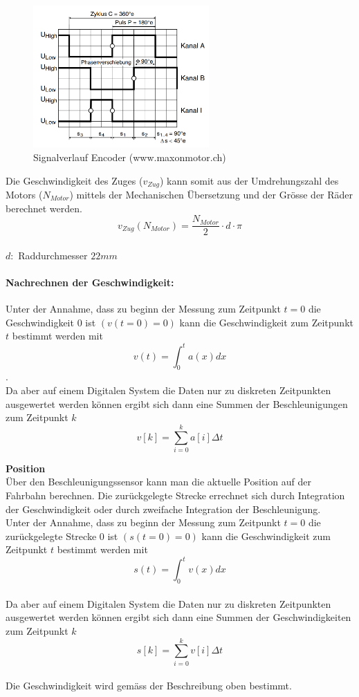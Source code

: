 \documentclass[../../main.tex]{subfiles}
\begin{document}
    \begin{figure}[H]
        \centering
        \includegraphics[width=0.6\textwidth]{Encoder_MR.png}
        \caption {Signalverlauf Encoder (www.maxonmotor.ch)}
        \label{fig:et_encoder}
    \end{figure}

    Die Geschwindigkeit des Zuges ($v_{Zug}$) kann somit aus der Umdrehungszahl des Motors ($N_{Motor}$) mittels der Mechanischen Übersetzung und der Grösse der Räder berechnet werden.
    $$v_{Zug}(N_{Motor}) = \frac{N_{Motor}}{2} \cdot d \cdot \pi$$\\
    $d:$ Raddurchmesser $22mm$\\

    \paragraph{Nachrechnen der Geschwindigkeit:}
    Unter der Annahme, dass zu beginn der Messung zum Zeitpunkt $t = 0$ die Geschwindigkeit $0$ ist $(v(t=0) = 0)$ kann die Geschwindigkeit zum Zeitpunkt $t$ bestimmt werden mit $$v(t) = \int_{0}^{t} a(x) dx$$.\\
    Da aber auf einem Digitalen System die Daten nur zu diskreten Zeitpunkten ausgewertet werden können ergibt sich dann eine Summen der Beschleunigungen zum Zeitpunkt $k$ $$v[k] = \sum_{i=0}^{k}a[i] \Delta t$$

    \textbf{Position}\\
    Über den Beschleunigungssensor kann man die aktuelle Position auf der Fahrbahn berechnen. Die zurückgelegte Strecke errechnet sich durch Integration der Geschwindigkeit oder durch zweifache Integration der Beschleunigung.\\
    Unter der Annahme, dass zu beginn der Messung zum Zeitpunkt $t = 0$ die zurückgelegte Strecke $0$ ist $(s(t=0) = 0)$ kann die Geschwindigkeit zum Zeitpunkt $t$ bestimmt werden mit $$s(t) = \int_{0}^{t} v(x) dx$$\\
    Da aber auf einem Digitalen System die Daten nur zu diskreten Zeitpunkten ausgewertet werden können ergibt sich dann eine Summen der Geschwindigkeiten zum Zeitpunkt $k$ $$s[k] = \sum_{i=0}^{k}v[i] \Delta t$$\\
    Die Geschwindigkeit wird gemäss der Beschreibung oben bestimmt.
\end{document}
